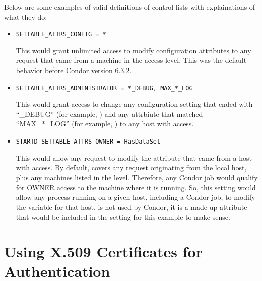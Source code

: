 Below are some examples of valid definitions of control lists with
explainations of what they do:

\begin{itemize}

\item \begin{verbatim}SETTABLE_ATTRS_CONFIG = *\end{verbatim}
This would grant unlimited access to modify configuration attributes
to any request that came from a machine in the  access
level. 
This was the default behavior before Condor version 6.3.2.

\item \begin{verbatim}SETTABLE_ATTRS_ADMINISTRATOR = *_DEBUG, MAX_*_LOG\end{verbatim} 
This would grant access to change any configuration setting that ended
with ``\_DEBUG'' (for example, ) and any
attrbiute that matched ``MAX\_*\_LOG'' (for example,
) to any host with 
access. 

\item \begin{verbatim}STARTD_SETTABLE_ATTRS_OWNER = HasDataSet\end{verbatim}
This would allow any request to modify the  
attribute that came from a host with  access.
By default,  covers any request originating from the
local host, plus any machines listed in the 
level.
Therefore, any Condor job would qualify for OWNER access to the
machine where it is running. 
So, this setting would allow any process running on a given host,
including a Condor job, to modify the  variable for
that host. 
 is not used by Condor, it is a made-up attribute
that would be included in the  setting for this
example to make sense.

\end{itemize}


\section{\label{sec:X509-Authentication}Using X.509 Certificates for
Authentication} 

